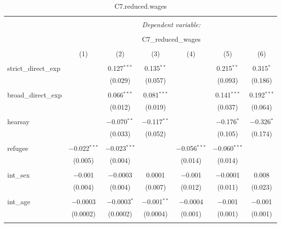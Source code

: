
\begin{table}[H] \centering 
  \caption{C7.reduced.wages} 
  \label{} 
\tiny 
\begin{tabular}{@{\extracolsep{4pt}}lcccccc} 
\\[-1.8ex]\hline 
\hline \\[-1.8ex] 
 & \multicolumn{6}{c}{\textit{Dependent variable:}} \\ 
\cline{2-7} 
\\[-1.8ex] & \multicolumn{6}{c}{C7\_reduced\_wages} \\ 
\\[-1.8ex] & (1) & (2) & (3) & (4) & (5) & (6)\\ 
\hline \\[-1.8ex] 
 strict\_direct\_exp &  & 0.127$^{***}$ & 0.135$^{**}$ &  & 0.215$^{**}$ & 0.315$^{*}$ \\ 
  &  & (0.029) & (0.057) &  & (0.093) & (0.186) \\ 
  & & & & & & \\ 
 broad\_direct\_exp &  & 0.066$^{***}$ & 0.081$^{***}$ &  & 0.141$^{***}$ & 0.192$^{***}$ \\ 
  &  & (0.012) & (0.019) &  & (0.037) & (0.064) \\ 
  & & & & & & \\ 
 hearsay &  & $-$0.070$^{**}$ & $-$0.117$^{**}$ &  & $-$0.176$^{*}$ & $-$0.326$^{*}$ \\ 
  &  & (0.033) & (0.052) &  & (0.105) & (0.174) \\ 
  & & & & & & \\ 
 refugee & $-$0.022$^{***}$ & $-$0.023$^{***}$ &  & $-$0.056$^{***}$ & $-$0.060$^{***}$ &  \\ 
  & (0.005) & (0.004) &  & (0.014) & (0.014) &  \\ 
  & & & & & & \\ 
 int\_sex & $-$0.001 & $-$0.0003 & 0.0001 & $-$0.001 & $-$0.0001 & 0.008 \\ 
  & (0.004) & (0.004) & (0.007) & (0.012) & (0.011) & (0.023) \\ 
  & & & & & & \\ 
 int\_age & $-$0.0003 & $-$0.0003$^{*}$ & $-$0.001$^{**}$ & $-$0.0004 & $-$0.001 & $-$0.001 \\ 
  & (0.0002) & (0.0002) & (0.0004) & (0.001) & (0.001) & (0.001) \\ 
  & & & & & & \\ 

\end{tabular}
\end{table}
